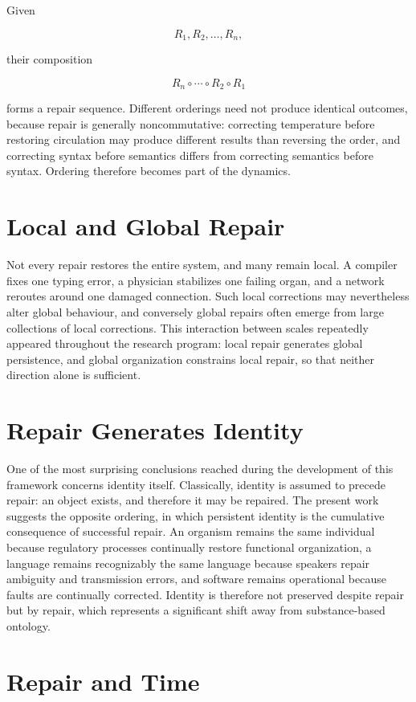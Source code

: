 \documentclass[11pt,oneside]{book}
\numberwithin{equation}{chapter}
\theoremstyle{definition}
\theoremstyle{plain}
\begin{document}
Given

\[
R_1,R_2,\ldots,R_n,
\]

their composition

\[
R_n
\circ
\cdots
\circ
R_2
\circ
R_1
\]

forms a repair sequence. Different orderings need not produce identical outcomes, because repair is generally noncommutative: correcting temperature before restoring circulation may produce different results than reversing the order, and correcting syntax before semantics differs from correcting semantics before syntax. Ordering therefore becomes part of the dynamics.

\section{Local and Global Repair}

Not every repair restores the entire system, and many remain local. A compiler fixes one typing error, a physician stabilizes one failing organ, and a network reroutes around one damaged connection. Such local corrections may nevertheless alter global behaviour, and conversely global repairs often emerge from large collections of local corrections. This interaction between scales repeatedly appeared throughout the research program: local repair generates global persistence, and global organization constrains local repair, so that neither direction alone is sufficient.

\section{Repair Generates Identity}

One of the most surprising conclusions reached during the development of this framework concerns identity itself. Classically, identity is assumed to precede repair: an object exists, and therefore it may be repaired. The present work suggests the opposite ordering, in which persistent identity is the cumulative consequence of successful repair. An organism remains the same individual because regulatory processes continually restore functional organization, a language remains recognizably the same language because speakers repair ambiguity and transmission errors, and software remains operational because faults are continually corrected. Identity is therefore not preserved despite repair but by repair, which represents a significant shift away from substance-based ontology.

\section{Repair and Time}
\end{document}
